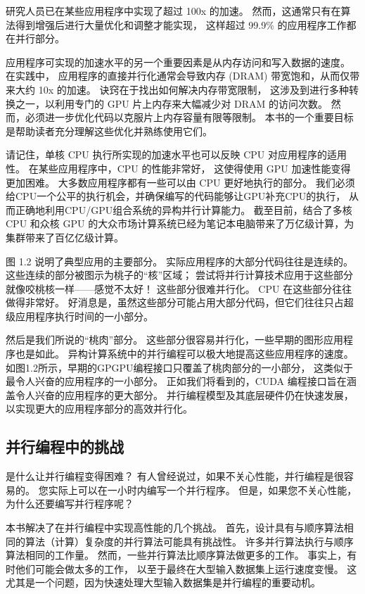 研究人员已在某些应用程序中实现了超过 100x 的加速。 然而，这通常只有在算法得到增强后进行大量优化和调整才能实现，
这样超过 99.9\% 的应用程序工作都在并行部分。

应用程序可实现的加速水平的另一个重要因素是从内存访问和写入数据的速度。 在实践中，
应用程序的直接并行化通常会导致内存 (DRAM) 带宽饱和，从而仅带来大约 10x 的加速。 诀窍在于找出如何解决内存带宽限制，
这涉及到进行多种转换之一，以利用专门的 GPU 片上内存来大幅减少对 DRAM 的访问次数。 
然而，必须进一步优化代码以克服片上内存容量有限等限制。 本书的一个重要目标是帮助读者充分理解这些优化并熟练使用它们。

请记住，单核 CPU 执行所实现的加速水平也可以反映 CPU 对应用程序的适用性。 在某些应用程序中，CPU 的性能非常好，
这使得使用 GPU 加速性能变得更加困难。 大多数应用程序都有一些可以由 CPU 更好地执行的部分。 
我们必须给CPU一个公平的执行机会，并确保编写的代码能够让GPU补充CPU的执行，
从而正确地利用CPU/GPU组合系统的异构并行计算能力。 
截至目前，结合了多核 CPU 和众核 GPU 的大众市场计算系统已经为笔记本电脑带来了万亿级计算，为集群带来了百亿亿级计算。

图 1.2 说明了典型应用的主要部分。 实际应用程序的大部分代码往往是连续的。 这些连续的部分被图示为桃子的“核”区域； 
尝试将并行计算技术应用于这些部分就像咬桃核一样——感觉不太好！ 这些部分很难并行化。 CPU 在这些部分往往做得非常好。 
好消息是，虽然这些部分可能占用大部分代码，但它们往往只占超级应用程序执行时间的一小部分。

然后是我们所说的“桃肉”部分。 这些部分很容易并行化，一些早期的图形应用程序也是如此。 
异构计算系统中的并行编程可以极大地提高这些应用程序的速度。 如图1.2所示，早期的GPGPU编程接口只覆盖了桃肉部分的一小部分，
这类似于最令人兴奋的应用程序的一小部分。 正如我们将看到的，CUDA 编程接口旨在涵盖令人兴奋的应用程序的更大部分。 
并行编程模型及其底层硬件仍在快速发展，以实现更大的应用程序部分的高效并行化。

\subsection{并行编程中的挑战}
是什么让并行编程变得困难？ 有人曾经说过，如果不关心性能，并行编程是很容易的。 您实际上可以在一小时内编写一个并行程序。 
但是，如果您不关心性能，为什么还要编写并行程序呢？

本书解决了在并行编程中实现高性能的几个挑战。 首先，设计具有与顺序算法相同的算法（计算）复杂度的并行算法可能具有挑战性。 
许多并行算法执行与顺序算法相同的工作量。 然而，一些并行算法比顺序算法做更多的工作。 事实上，有时他们可能会做太多的工作，
以至于最终在大型输入数据集上运行速度变慢。 这尤其是一个问题，因为快速处理大型输入数据集是并行编程的重要动机。

